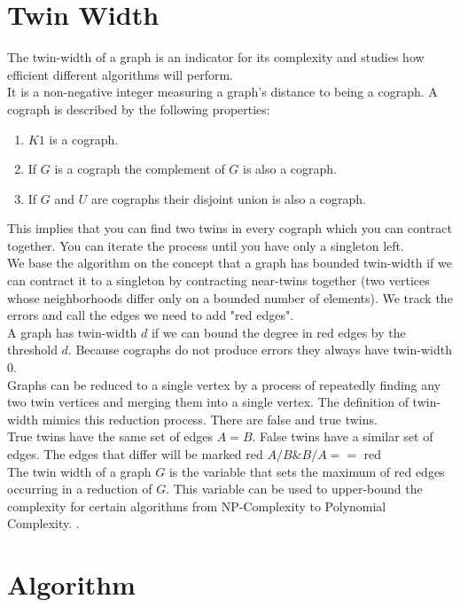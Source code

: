 \documentclass[10pt]{article}
\begin{document}
\section{Twin Width}
The twin-width of a graph is an indicator for its complexity and studies how efficient different algorithms will perform.\\
It is a non-negative integer measuring a graph's distance to being a cograph. A cograph is described by the following properties:

\begin{enumerate}
	\item $K1$ is a cograph.
	\item If $G$ is a cograph the complement of $G$ is also a cograph.
	\item If $G$ and $U$ are cographs their disjoint union is also a cograph.
\end{enumerate}

This implies that you can find two twins in every cograph which you can contract together. You can iterate the process until you have only a singleton left.\\
We base the algorithm on the concept that a graph has bounded twin-width if we can contract it to a singleton
by contracting near-twins together (two vertices whose neighborhoods differ only on a
bounded number of elements). We track the errors and call the edges we need to
add "red edges".\\
A graph has twin-width $d$ if we can bound the degree in red edges by the threshold $d$.
Because cographs do not produce errors they always have twin-width $0$. \\

Graphs can be reduced to a single vertex by a process of repeatedly finding any two
twin vertices and merging them into a single vertex. The definition of twin-width mimics
this reduction process. There are false and true twins.\\
True twins have the same set of edges $A = B$. False twins have a similar set of edges. The
edges that differ will be marked red ${A / B \& B/A} ==$ red\\
The twin width of a graph $G$ is the variable that sets the maximum of red edges occurring in a
reduction of $G$. This variable can be used to upper-bound the complexity for
certain algorithms from NP-Complexity to Polynomial Complexity. \cite{bonnet2021twini} \cite{bonnet2021twinii}.

\section{Algorithm}
\end{document}
